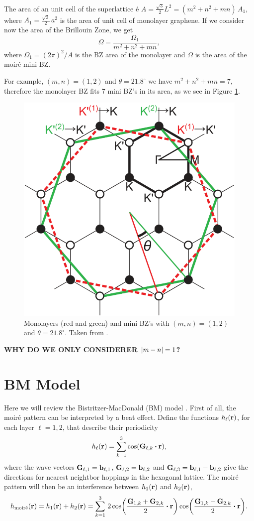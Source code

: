 \documentclass[a4paper,10pt]{article}
\begin{document}
\n


The area of an unit cell of the superlattice é $A = \frac{\sqrt{3}}{2} L^2 = (m^2 + n^2 + mn) \, A_1$, where $A_1 = \frac{\sqrt{3}}{2} \, a^2$ is the area of unit cell of monolayer graphene. If we consider now the area of the Brillouin Zone, we get
\begin{equation} \label{eq:bz-volume}
\Omega = \frac{\Omega_1}{m^2 + n^2 + mn},
\end{equation}
where $\Omega_1 = (2\pi)^2/A$ is the BZ area of the monolayer and $\Omega$ is the area of the moiré mini BZ.

\n

For example, $(m,n) = (1,2)$ and $\theta = 21.8^\circ$ we have $m^2 + n^2 + mn = 7$, therefore the monolayer BZ fits 7 mini BZ's in its area, as we see in Figure \ref{fig:bzminibz}.
\begin{figure}[H]
\centering
\includegraphics[width=0.5\linewidth]{fig/bzminibz.png}
\caption{Monolayers (red and green) and mini BZ's with $(m,n) = (1,2)$ and $\theta = 21.8^\circ$. Taken from \cite{koshino2012}.}
\label{fig:bzminibz}
\end{figure}

\n

\textbf{WHY DO WE ONLY CONSIDERER $\abs{m-n} = 1$?}

\pagebreak

\section{BM Model}

Here we will review the Bistritzer-MacDonald (BM) model \cite{macdonald2011}. First of all, the moiré pattern can be interpreted by a beat effect. Define the functions $h_\ell({\vb{r}})$, for each layer $\ell = 1, 2$, that describe their periodicity
$$
h_\ell(\r) = \sum_{k=1}^{3} \cos(\vb{G}_{\ell,k} \vdot \r),
$$
where the wave vectors $\vb{G}_{\ell,1} = \vb{b}_{\ell,1}$, $\vb{G}_{\ell,2} = \vb{b}_{\ell,2}$ and $\vb{G}_{\ell,3} = \vb{b}_{\ell,1} - \vb{b}_{\ell,2}$ give the directions for nearest neightbor hoppings in the hexagonal lattice. The moiré pattern will then be an interference between $h_1({\vb{r}})$ and $h_2({\vb{r}})$,
$$
h_{\text{moiré}}(\r) = h_1(\r) + h_2(\r) =
\sum_{k=1}^{3}
\, 2 \cos(\frac{\vb{G}_{1,k}+\vb{G}_{2,k}}{2} \vdot \r) \cos(\frac{\vb{G}_{1,k}-\vb{G}_{2,k}}{2} \vdot \r).
$$
\end{document}
